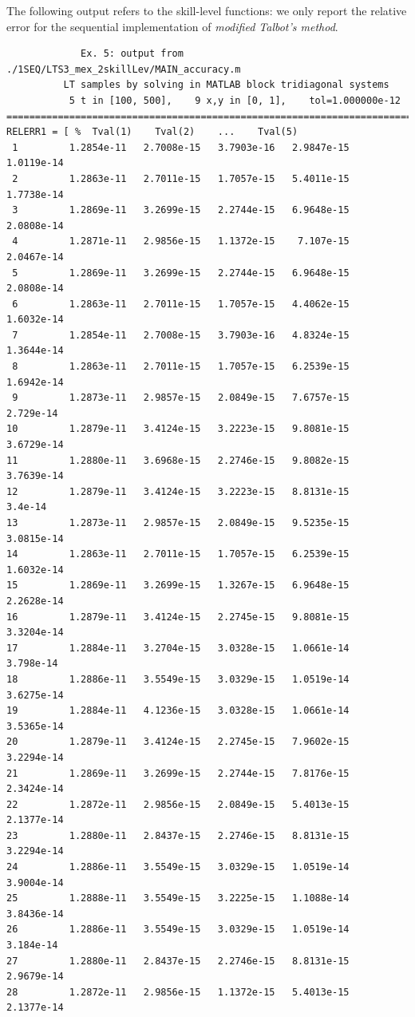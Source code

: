 \documentclass[a4paper,10pt]{report}%
\begin{document}
The following output refers to the skill-level functions: we only report the relative error for the
sequential implementation of {\em modified Talbot's method}.
\begin{lstlisting}
             Ex. 5: output from ./1SEQ/LTS3_mex_2skillLev/MAIN_accuracy.m
          LT samples by solving in MATLAB block tridiagonal systems
           5 t in [100, 500],    9 x,y in [0, 1],    tol=1.000000e-12
====================================================================================
RELERR1 = [ %  Tval(1)    Tval(2)    ...    Tval(5)
 1         1.2854e-11   2.7008e-15   3.7903e-16   2.9847e-15   1.0119e-14
 2         1.2863e-11   2.7011e-15   1.7057e-15   5.4011e-15   1.7738e-14
 3         1.2869e-11   3.2699e-15   2.2744e-15   6.9648e-15   2.0808e-14
 4         1.2871e-11   2.9856e-15   1.1372e-15    7.107e-15   2.0467e-14
 5         1.2869e-11   3.2699e-15   2.2744e-15   6.9648e-15   2.0808e-14
 6         1.2863e-11   2.7011e-15   1.7057e-15   4.4062e-15   1.6032e-14
 7         1.2854e-11   2.7008e-15   3.7903e-16   4.8324e-15   1.3644e-14
 8         1.2863e-11   2.7011e-15   1.7057e-15   6.2539e-15   1.6942e-14
 9         1.2873e-11   2.9857e-15   2.0849e-15   7.6757e-15    2.729e-14
10         1.2879e-11   3.4124e-15   3.2223e-15   9.8081e-15   3.6729e-14
11         1.2880e-11   3.6968e-15   2.2746e-15   9.8082e-15   3.7639e-14
12         1.2879e-11   3.4124e-15   3.2223e-15   8.8131e-15      3.4e-14
13         1.2873e-11   2.9857e-15   2.0849e-15   9.5235e-15   3.0815e-14
14         1.2863e-11   2.7011e-15   1.7057e-15   6.2539e-15   1.6032e-14
15         1.2869e-11   3.2699e-15   1.3267e-15   6.9648e-15   2.2628e-14
16         1.2879e-11   3.4124e-15   2.2745e-15   9.8081e-15   3.3204e-14
17         1.2884e-11   3.2704e-15   3.0328e-15   1.0661e-14    3.798e-14
18         1.2886e-11   3.5549e-15   3.0329e-15   1.0519e-14   3.6275e-14
19         1.2884e-11   4.1236e-15   3.0328e-15   1.0661e-14   3.5365e-14
20         1.2879e-11   3.4124e-15   2.2745e-15   7.9602e-15   3.2294e-14
21         1.2869e-11   3.2699e-15   2.2744e-15   7.8176e-15   2.3424e-14
22         1.2872e-11   2.9856e-15   2.0849e-15   5.4013e-15   2.1377e-14
23         1.2880e-11   2.8437e-15   2.2746e-15   8.8131e-15   3.2294e-14
24         1.2886e-11   3.5549e-15   3.0329e-15   1.0519e-14   3.9004e-14
25         1.2888e-11   3.5549e-15   3.2225e-15   1.1088e-14   3.8436e-14
26         1.2886e-11   3.5549e-15   3.0329e-15   1.0519e-14    3.184e-14
27         1.2880e-11   2.8437e-15   2.2746e-15   8.8131e-15   2.9679e-14
28         1.2872e-11   2.9856e-15   1.1372e-15   5.4013e-15   2.1377e-14

\end{lstlisting}
\end{document}
